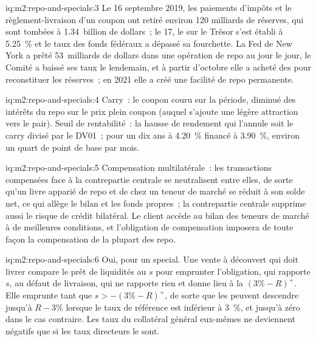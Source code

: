 \begin{solution}{iq:m2:repo-and-specials:3}
Le 16 septembre 2019, les paiements d'impôts et le règlement-livraison d'un coupon ont retiré environ 120
milliards de réserves, qui sont tombées à 1.34~billion de dollars~; le 17, le  sur le Trésor
s'est établi à 5.25~\% et le taux des fonds fédéraux a dépassé sa fourchette. La Fed de New York
a prêté 53~milliards de dollars dans une opération de repo au jour le jour, le Comité a baissé ses taux
le lendemain, et à partir d'octobre elle a acheté des  pour reconstituer les réserves~; en 2021
elle a créé une facilité de repo permanente.
\end{solution}

\begin{solution}{iq:m2:repo-and-specials:4}
Carry~: le coupon couru sur la période, diminué des intérêts du repo sur le
prix plein coupon (auquel s'ajoute une légère attraction vers le pair). Seuil de rentabilité~: la hausse de rendement qui l'annule
soit le carry divisé par le DV01~; pour un dix ans à 4.20~\% financé à 3.90~\%, environ un
quart de point de base par mois.
\end{solution}

\begin{solution}{iq:m2:repo-and-specials:5}
Compensation multilatérale~: les transactions compensées face à la contrepartie centrale se neutralisent entre elles,
de sorte qu'un livre apparié de repo et de  chez un teneur de marché se réduit à son solde net,
ce qui allège le bilan et les fonds propres~; la contrepartie centrale supprime aussi le risque
de crédit bilatéral. Le client accède au bilan des teneurs de marché à de meilleures conditions,
et l'obligation de compensation imposera de toute façon la compensation de la plupart des repo.
\end{solution}

\begin{solution}{iq:m2:repo-and-specials:6}
Oui, pour un special. Une vente à découvert qui doit livrer compare le prêt de liquidités au
 $s$ pour emprunter l'obligation, qui rapporte $s$, au défaut de livraison,
qui ne rapporte rien et donne lieu à la  $(3\% - R)^+$. Elle emprunte tant que $s > -(3\% -
R)^+$, de sorte que les  peuvent descendre jusqu'à $R - 3\%$ lorsque le taux de référence est
inférieur à 3~\%, et jusqu'à zéro dans le cas contraire. Les taux du collatéral général eux-mêmes ne deviennent
négatifs que si les taux directeurs le sont.
\end{solution}
